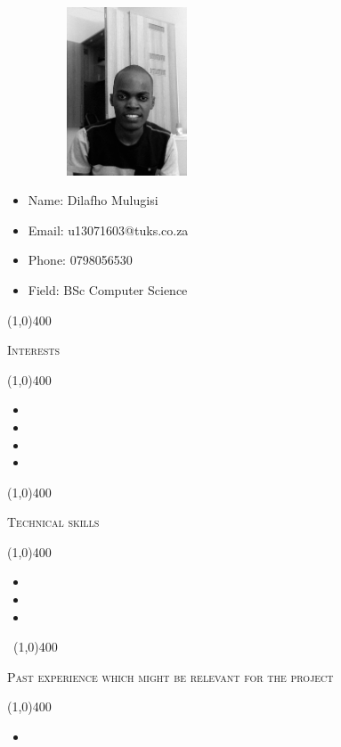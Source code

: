 \documentclass[12pt,a4paper]{report}
\begin{document}
\newpage
\vspace*{-3cm}\
\begin{minipage}{0.5\textwidth}
\begin{figure}[H]
\includegraphics[width=5cm,height=5cm,keepaspectratio]{u13071603.jpg}
\end{figure}
\end{minipage} \hfill
\begin{minipage}{0.6\textwidth}
\begin{itemize}
\item[] Name: Dilafho Mulugisi
\item[] Email: u13071603@tuks.co.za
\item[] Phone: 0798056530
\item[] Field: BSc Computer Science
\end{itemize}
\end{minipage}

\begin{center}
	
	\line(1,0){400}\\
	{\scshape\large Interests\par}
	\line(1,0){400}\\
	\end{center}
	\begin{itemize}
\item 
\item 
\item 
\item 
\end{itemize}
	
	\begin{center}
	
	\line(1,0){400}\\
	{\scshape\large Technical skills\par}
	\line(1,0){400}\\
	\end{center}
		\begin{itemize}
\item 
\item 
\item  
\end{itemize}
\newpage
\begin{center}
	\vspace*{-3cm}\
	\line(1,0){400}\\
	{\scshape\large Past experience which might be relevant for the project\par}
	\line(1,0){400}\\
	\end{center}
		\begin{itemize}
\item 

\end{itemize}
\end{document}

